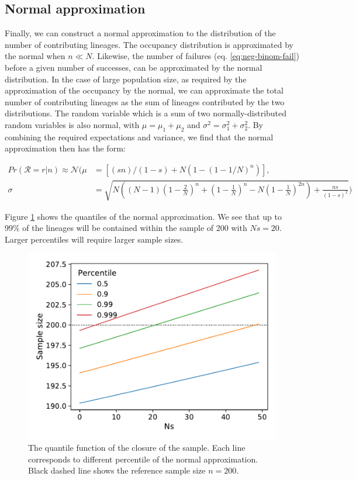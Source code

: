 \documentclass[review]{elsarticle}
\begin{document}
\subsection{Normal approximation}

Finally, we can construct a normal approximation to the distribution of the number of contributing
lineages. The occupancy distribution is approximated by the normal \citep{ONeill2019} when $n \ll N$.
Likewise, the number of failures (eq. \eqref{eq:neg-binom-fail}) before a given number of successes,
can be approximated by the normal distribution. In the case of large population size, as required by
the approximation of the occupancy by the normal, we can approximate the total number of
contributing lineages as the sum of lineages contributed by the two distributions. The random
variable which is a sum of two normally-distributed random variables is also normal, with
$\mu=\mu_1+\mu_2$ and $\sigma^2 = \sigma^2_1 + \sigma^2_2$. By combining the required expectations
and variance, we find that the normal approximation then has the form:

\begin{align}
  Pr(\mathcal{R}=r|n) \approx \mathcal{N}( \mu &= \left[(s n)/(1 - s) + N (1 - (1 - 1/N)^n)\right],\\
  \sigma &= \sqrt{N \left((N-1) \left(1-\frac{2}{N}\right)^n+\left(1-\frac{1}{N}\right)^n-N\left(1-\frac{1}{N}\right)^{2 n}\right)+\frac{n s}{(1-s)^2}})
\end{align}

Figure \ref{fig:normal-approximation} shows the quantiles of the normal approximation. We see that
up to $99\%$ of the lineages will be contained within the sample of 200 with $Ns=20$. Larger
percentiles will require larger sample sizes.

\begin{figure}
  \centering
  \includegraphics[]{fig/quantile.pdf}
   \caption{The quantile function of the closure of the sample. Each line corresponds to different
     percentile of the normal approximation. Black dashed line shows the reference sample size $n=200$.}
  \label{fig:normal-approximation}
\end{figure}
\end{document}
